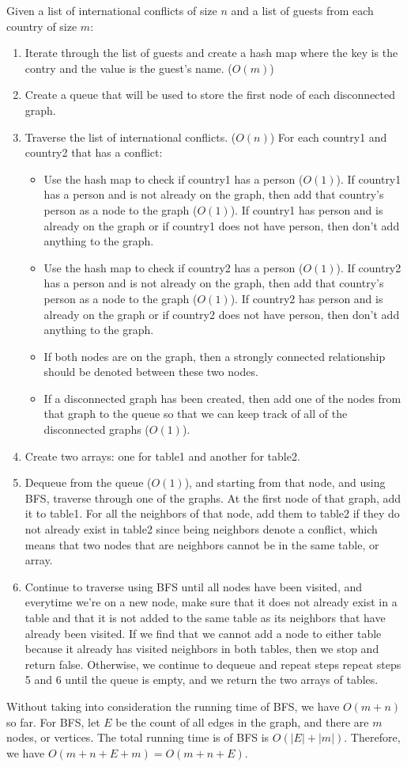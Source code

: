\documentclass{article}
\begin{document}
\noindent Given a list of international conflicts of size $n$ and a list of guests from each country of size $m$:\\
\begin{enumerate}
\item Iterate through the list of guests and create a hash map where the key is the contry and the value is the guest's name. ($O(m)$)
\item Create a queue that will be used to store the first node of each disconnected graph.
\item Traverse the list of international conflicts. ($O(n)$) For each country1 and country2 that has a conflict:
\begin{itemize}
\item Use the hash map to check if country1 has a person ($O(1)$). If country1 has a person and is not already on the graph, then add that country's person as a node to the graph ($O(1)$). If country1 has person and is already on the graph or if country1 does not have person, then don't add anything to the graph.
\item Use the hash map to check if country2 has a person ($O(1)$). If country2 has a person and is not already on the graph, then add that country's person as a node to the graph ($O(1)$). If country2 has person and is already on the graph or if country2 does not have person, then don't add anything to the graph.
\item If both nodes are on the graph, then a strongly connected relationship should be denoted between these two nodes.
\item If a disconnected graph has been created, then add one of the nodes from that graph to the queue so that we can keep track of all of the disconnected graphs ($O(1)$).
\end{itemize}
\item Create two arrays: one for table1 and another for table2.
\item Dequeue from the queue ($O(1)$), and starting from that node, and using BFS, traverse through one of the graphs. At the first node of that graph, add it to table1. For all the neighbors of that node, add them to table2 if they do not already exist in table2 since being neighbors denote a conflict, which means that two nodes that are neighbors cannot be in the same table, or array.
\item Continue to traverse using BFS until all nodes have been visited, and everytime we're on a new node, make sure that it does not already exist in a table and that it is not added to the same table as its neighbors that have already been visited. If we find that we cannot add a node to either table because it already has visited neighbors in both tables, then we stop and return false. Otherwise, we continue to dequeue and repeat steps repeat steps 5 and 6 until the queue is empty, and we return the two arrays of tables.
\end{enumerate}

\noindent Without taking into consideration the running time of BFS, we have $O(m+n)$ so far. For BFS, let $E$ be the count of all edges in the graph, and there are $m$ nodes, or vertices. The total running time is of BFS is $O(|E|+|m|)$. Therefore, we have $O(m+n+E+m) = O(m+n+E)$.
\end{document}
